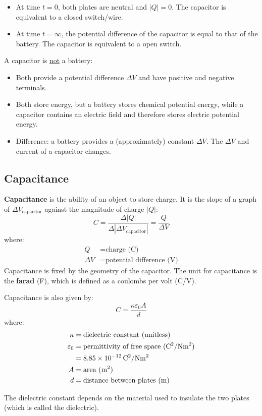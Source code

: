 \documentclass{article}
\newcommand{\defitheorem}[2]{\begin{tcolorbox}[title={#1},colback=violet!5!white,colframe=violet!75!black,parbox=false] #2 \end{tcolorbox}}
\begin{document}
\begin{itemize}
	\item At time $t=0$, both plates are neutral and $\left|Q\right|=0$. The capacitor is equivalent to a closed switch/wire.
	\item At time $t=\infty$, the potential difference of the capacitor is equal to that of the battery. The capacitor is equivalent to a open switch.
\end{itemize}
A capacitor is \ul{not} a battery:
\begin{itemize}
	\item Both provide a potential difference $\Delta V$ and have positive and negative terminals.
	\item Both store energy, but a battery stores chemical potential energy, while a capacitor contains an electric field and therefore stores electric potential energy.
	\item Difference: a battery provides a (approximately) constant $\Delta V$. The $\Delta V$ and current of a capacitor changes.
\end{itemize}

\subsection{Capacitance}

\defitheorem{Capacitance}{
	 \textbf{Capacitance} is the ability of an object to store charge. It is the slope of a graph of $\Delta V_\text{capacitor}$ against the magnitude of charge $\left|Q\right|$:
	\begin{equation*}
		C
		=\frac{\Delta \left|Q\right|}{\Delta \left|\Delta V_\text{capacitor}\right|}
		=\frac{Q}{\Delta V}
	\end{equation*}
	where:
	\begin{align*}
		Q&=\text{charge (C)} \\
		\Delta V&=\text{potential difference (V)}
	\end{align*}
	Capacitance is fixed by the geometry of the capacitor. The unit for capacitance is the \textbf{farad} (\si{F}), which is defined as a coulombs per volt (\si{C/V}).

	Capacitance is also given by:
	\begin{equation*}
	    C=\frac{\kappa \varepsilon_0 A}{d}
	\end{equation*}
	where:
	\begin{align*}
		\kappa
		&=\text{dielectric constant (unitless)} \\
		\varepsilon_0
		&=\text{permittivity of free space (\si{\coulomb^2/\newton\meter^2})} \\
		&=8.85\times 10^{-12}\,\si{\coulomb^2/\newton\meter^2} \\
		A&=\text{area (\si{m^2})} \\
		d&=\text{distance between plates (m)}
	\end{align*}
}
The dielectric constant depends on the material used to insulate the two plates (which is called the dielectric).
\end{document}

